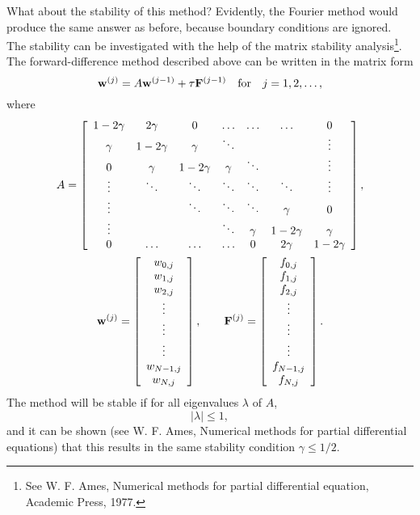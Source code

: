 What about the stability of this method?
Evidently, the Fourier method would produce the same answer as before,
because boundary conditions are ignored. The stability can be investigated with the help
of the matrix stability analysis\footnote{See W. F. Ames, Numerical methods for partial differential equation,
Academic Press, 1977.}. The forward-difference method described above can be written in the matrix form
\begin{equation}
{\bf w}^{(j)}=A{\bf w}^{(j-1)}+\tau {\bf F}^{(j-1)} \quad \hbox{for} \quad j=1,2,\dots, \label{d106}
\end{equation}
where
\begin{gather}
A=\left[
\begin{array}{ccccccc}
1-2\gamma &2\gamma &0      &\dots  &\dots  &\dots &0 \\
\gamma &1-2\gamma &\gamma &\ddots  &       &     &\vdots \\
0      &\gamma &1-2\gamma &\gamma &\ddots &      &\vdots \\
\vdots &\ddots &\ddots &\ddots &\ddots &\ddots &\vdots  \\
\vdots &       &\ddots &\ddots &\ddots &\gamma &0 \\
\vdots &       &       &\ddots &\gamma &1-2\gamma &\gamma \\
0      &\dots  &\dots  &\dots  &0      &2\gamma &1-2\gamma
\end{array}\right], \\
{\bf w}^{(j)}=\left[
\begin{array}{c}
w_{0,j} \\
w_{1,j} \\
w_{2,j} \\
\vdots \\
\vdots \\
\vdots \\
w_{N-1,j} \\
w_{N,j}
\end{array}\right], \qquad
{\bf F}^{(j)}=\left[
\begin{array}{c}
f_{0,j} \\
f_{1,j} \\
f_{2,j} \\
\vdots \\
\vdots \\
\vdots \\
f_{N-1,j} \\
f_{N,j}
\end{array}\right].
\label{d107}
\end{gather}
The method will be stable if for all eigenvalues $\lambda$ of $A$,
\[
\vert \lambda\vert\leq 1,
\]
and it can be shown (see W. F. Ames, Numerical methods for partial differential equations)
that this results in the same stability condition $\gamma\leq 1/2$.



